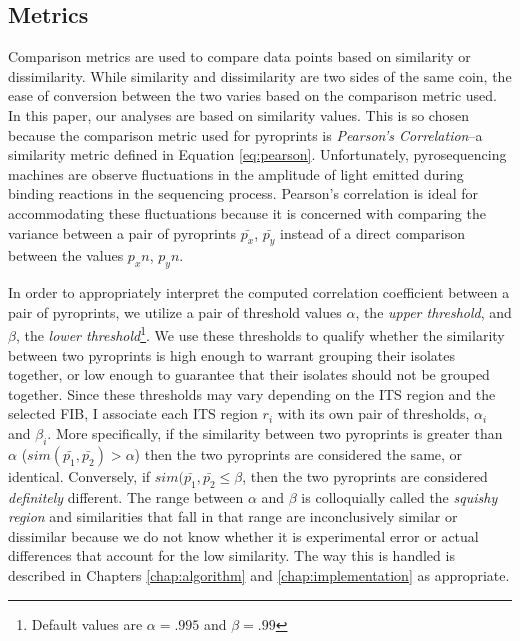 \documentclass[12pt]{ucthesis}
\begin{document}
      \subsection{Metrics}
      Comparison metrics are used to compare data points based on similarity
      or dissimilarity. While similarity and dissimilarity are two sides of
      the same coin, the ease of conversion between the two varies based on
      the comparison metric used. In this paper, our analyses are based on
      similarity values. This is so chosen because the comparison metric used
      for pyroprints is \textit{Pearson's Correlation}--a similarity metric
      defined in Equation \ref{eq:pearson}. Unfortunately, pyrosequencing machines
      are observe fluctuations in the amplitude of light emitted
      during binding reactions in the sequencing process. Pearson's correlation
      is ideal for accommodating these fluctuations because it is
      concerned with comparing the variance between a pair of pyroprints
      $\bar{p_x}$, $\bar{p_y}$ instead of a direct comparison between the
      values $p_xn$, $p_yn$.

      In order to appropriately interpret the computed correlation coefficient
      between a pair of pyroprints, we utilize a pair of threshold values
      $\alpha$, the \textit{upper threshold}, and $\beta$, the \textit{lower
      threshold}\footnote{Default values are $\alpha = .995$ and $\beta =
      .99$}. We use these thresholds to qualify whether the
      similarity between two pyroprints is high enough to warrant grouping
      their isolates together, or low enough to guarantee that their isolates
      should not be grouped together. Since these thresholds may vary depending
      on the ITS region and the selected FIB, I associate each ITS region
      $r_i$ with its own pair of thresholds, $\alpha_i$ and $\beta_i$.
      More specifically, if the similarity between two pyroprints is greater
      than $\alpha$ ($sim(\bar{p_1}, \bar{p_2}) > \alpha$) then the two
      pyroprints are considered the same, or identical. Conversely, if
      $sim(\bar{p_1}, \bar{p_2} \le \beta$, then the two pyroprints are
      considered \textit{definitely} different. The range between $\alpha$ and
      $\beta$ is colloquially called the \textit{squishy region} and
      similarities that fall in that range are inconclusively similar or
      dissimilar because we do not know whether it is experimental error or
      actual differences that account for the low similarity. The way this is
      handled is described in Chapters \ref{chap:algorithm} and
      \ref{chap:implementation} as appropriate.
\end{document}
